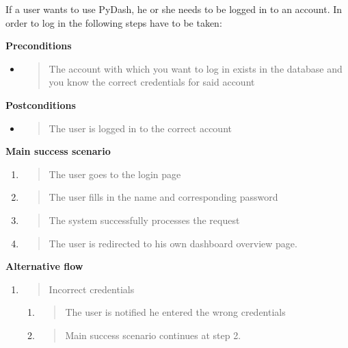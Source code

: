 If a user wants to use PyDash, he or she needs to be logged in to an
account. In order to log in the following steps have to be taken:

\textbf{Preconditions}

\begin{itemize}
\item
  \begin{quote}
  The account with which you want to log in exists in the database and
  you know the correct credentials for said account
  \end{quote}
\end{itemize}

\textbf{Postconditions}

\begin{itemize}
\item
  \begin{quote}
  The user is logged in to the correct account
  \end{quote}
\end{itemize}

\textbf{Main success scenario}

\begin{enumerate}
\def\labelenumi{\arabic{enumi}.}
\item
  \begin{quote}
  The user goes to the login page
  \end{quote}
\item
  \begin{quote}
  The user fills in the name and corresponding password
  \end{quote}
\item
  \begin{quote}
  The system successfully processes the request
  \end{quote}
\item
  \begin{quote}
  The user is redirected to his own dashboard overview page.
  \end{quote}
\end{enumerate}

\textbf{Alternative flow}

\begin{enumerate}
\def\labelenumi{\arabic{enumi}.}
\setcounter{enumi}{2}
\item
  \begin{quote}
  Incorrect credentials
  \end{quote}

  \begin{enumerate}
  \def\labelenumii{\alph{enumii}.}
  \item
    \begin{quote}
    The user is notified he entered the wrong credentials
    \end{quote}
  \item
    \begin{quote}
    Main success scenario continues at step 2.
    \end{quote}
  \end{enumerate}
\end{enumerate}

